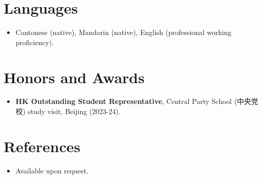 \documentclass[11pt,a4paper,sans]{moderncv}
\begin{document}

\section{Languages}
\vspace{1pt}
\begin{itemize}
\item {Cantonese (native), Mandarin (native), English (professional working proficiency).}
\end{itemize}


\section{Honors and Awards}
\vspace{1pt}
\begin{itemize}
\item{\textbf{HK Outstanding Student Representative}, Central Party School (中央党校) study visit, Beijing (2023-24).}
\end{itemize}


\section{References}
\vspace{1pt}
\begin{itemize}
\item{Available upon request.}
\end{itemize}
\end{document}
